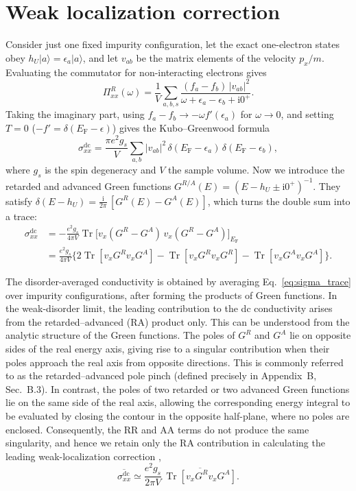 \section*{Weak localization correction}
Consider just one fixed impurity configuration, let the exact one-electron states obey $h_U|a\rangle=\epsilon_a|a\rangle$, and let $v_{ab}$ be the matrix elements of the velocity $p_x/m$. Evaluating the commutator for non-interacting electrons gives
\begin{equation}
    \Pi^{R}_{xx}(\omega)
    = \frac{1}{V}\sum_{a,b,s}\frac{(f_a-f_b)\,|v_{ab}|^2}{\omega+\epsilon_a-\epsilon_b+\mathrm{i}0^+}.
\end{equation}
Taking the imaginary part, using $f_a-f_b\to-\omega f'(\epsilon_a)$ for $\omega\to0$, and setting $T=0$ ($-f'=\delta(E_{\mathrm F}-\epsilon)$) gives the Kubo--Greenwood formula \cite{Kubo1957,Greenwood1958}
\begin{equation}
    \sigma_{xx}^{\mathrm{dc}}
    = \frac{\pi e^2 g_s}{V}\sum_{a,b}|v_{ab}|^2\,
      \delta(E_{\mathrm F}-\epsilon_a)\,\delta(E_{\mathrm F}-\epsilon_b),
\end{equation}
where $g_s$ is the spin degeneracy and $V$ the sample volume. Now we introduce the retarded and advanced Green functions  $G^{R/A}(E)=(E-h_U\pm\mathrm{i}0^+)^{-1}$. They satisfy $\delta(E-h_U)=\frac{\mathrm{i}}{2\pi}\,[G^R(E)-G^A(E)]$, which turns the double sum into a trace:
\begin{align}
    \sigma_{xx}^{\mathrm{dc}}
    &= -\frac{e^2 g_s}{4\pi V}\operatorname{Tr}\!\big[v_x(G^R-G^A)\,v_x(G^R-G^A)\big]_{E_{\mathrm F}} \nonumber\\
    &= \frac{e^2 g_s}{4\pi V}\Big\{2\operatorname{Tr}[v_xG^Rv_xG^A]
       -\operatorname{Tr}[v_xG^Rv_xG^R]
       -\operatorname{Tr}[v_xG^Av_xG^A]\Big\}.
    \label{eq:sigma_trace}
\end{align}

The disorder-averaged conductivity is obtained by averaging Eq.~\eqref{eq:sigma_trace} over impurity configurations, after forming the products of Green functions. In the weak-disorder limit, the leading contribution to the dc conductivity arises from the retarded--advanced (RA) product only. This can be understood from the analytic structure of the Green functions. The poles of $G^R$ and $G^A$ lie on opposite sides of the real energy axis, giving rise to a singular contribution when their poles approach the real axis from opposite directions. This is commonly referred to as the retarded--advanced pole pinch (defined precisely in Appendix~B, Sec.~B.3). In contrast, the poles of two retarded or two advanced Green functions lie on the same side of the real axis, allowing the corresponding energy integral to be evaluated by closing the contour in the opposite half-plane, where no poles are enclosed. Consequently, the RR and AA terms do not produce the same singularity, and hence we retain only the RA contribution in calculating the leading weak-localization correction \cite{Coleman2015},
\begin{equation}
    \overline{\sigma_{xx}^{\mathrm{dc}}}
    \simeq
    \frac{e^2 g_s}{2\pi V}\,
    \overline{\operatorname{Tr}\!\left[v_x G^R v_x G^A\right]}.
    \label{eq:sigma_RA}
\end{equation}

